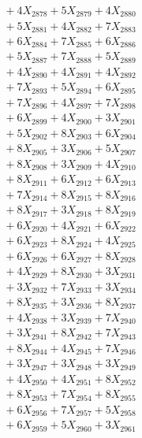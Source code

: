 \documentclass[a4paper,10pt]{article}
\begin{document}
{\begin{align}
&\;  + 4 X_{2878} + 5 X_{2879} + 4 X_{2880} \\[0.3ex]
&\;  + 5 X_{2881} + 4 X_{2882} + 7 X_{2883} \\[0.3ex]
&\;  + 6 X_{2884} + 7 X_{2885} + 6 X_{2886} \\[0.3ex]
&\;  + 5 X_{2887} + 7 X_{2888} + 5 X_{2889} \\[0.5ex]\allowbreak
&\;  + 4 X_{2890} + 4 X_{2891} + 4 X_{2892} \\[0.3ex]
&\;  + 7 X_{2893} + 5 X_{2894} + 6 X_{2895} \\[0.3ex]
&\;  + 7 X_{2896} + 4 X_{2897} + 7 X_{2898} \\[0.3ex]
&\;  + 6 X_{2899} + 4 X_{2900} + 3 X_{2901} \\[0.3ex]
&\;  + 5 X_{2902} + 8 X_{2903} + 6 X_{2904} \\[0.3ex]
&\;  + 8 X_{2905} + 3 X_{2906} + 5 X_{2907} \\[0.3ex]
&\;  + 8 X_{2908} + 3 X_{2909} + 4 X_{2910} \\[0.3ex]
&\;  + 8 X_{2911} + 6 X_{2912} + 6 X_{2913} \\[0.3ex]
&\;  + 7 X_{2914} + 8 X_{2915} + 8 X_{2916} \\[0.3ex]
&\;  + 8 X_{2917} + 3 X_{2918} + 8 X_{2919} \\[0.5ex]\allowbreak
&\;  + 6 X_{2920} + 4 X_{2921} + 6 X_{2922} \\[0.3ex]
&\;  + 6 X_{2923} + 8 X_{2924} + 4 X_{2925} \\[0.3ex]
&\;  + 6 X_{2926} + 6 X_{2927} + 8 X_{2928} \\[0.3ex]
&\;  + 4 X_{2929} + 8 X_{2930} + 3 X_{2931} \\[0.3ex]
&\;  + 3 X_{2932} + 7 X_{2933} + 3 X_{2934} \\[0.3ex]
&\;  + 8 X_{2935} + 3 X_{2936} + 8 X_{2937} \\[0.3ex]
&\;  + 4 X_{2938} + 3 X_{2939} + 7 X_{2940} \\[0.3ex]
&\;  + 3 X_{2941} + 8 X_{2942} + 7 X_{2943} \\[0.3ex]
&\;  + 8 X_{2944} + 4 X_{2945} + 7 X_{2946} \\[0.3ex]
&\;  + 3 X_{2947} + 3 X_{2948} + 3 X_{2949} \\[0.5ex]\allowbreak
&\;  + 4 X_{2950} + 4 X_{2951} + 8 X_{2952} \\[0.3ex]
&\;  + 8 X_{2953} + 7 X_{2954} + 8 X_{2955} \\[0.3ex]
&\;  + 6 X_{2956} + 7 X_{2957} + 5 X_{2958} \\[0.3ex]
&\;  + 6 X_{2959} + 5 X_{2960} + 3 X_{2961} \\[0.3ex]

\end{align}}
\end{document}
